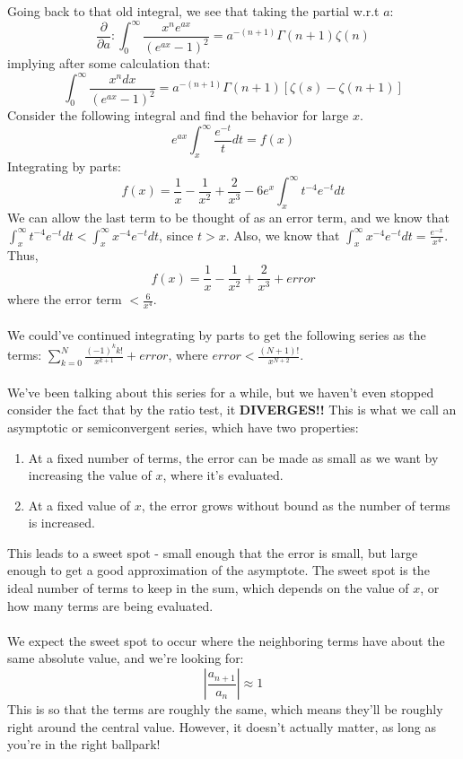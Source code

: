 \documentclass{article}
\begin{document}
\\ \\
Going back to that old integral, we see that taking the partial w.r.t $a$:
\[\frac{\partial}{\partial a}: \int_{0}^{\infty}\frac{x^ne^{ax}}{(e^{ax}-1)^2} = a^{-(n+1)}\Gamma(n+1)\zeta(n)\]
implying after some calculation that:
\[\int_{0}^{\infty}\frac{x^ndx}{(e^{ax}-1)^2} = a^{-(n+1)}\Gamma(n+1)[\zeta(s)-\zeta(n+1)]\]
\newpage
Consider the following integral and find the behavior for large $x$.
\[e^{ax}\int_{x}^{\infty}\frac{e^{-t}}{t}dt = f(x)\]
Integrating by parts:
\[f(x) = \frac 1 x - \frac 1 {x^2} + \frac 2 {x^3} - 6e^x\int_{x}^{\infty} t^{-4}e^{-t}dt\]
We can allow the last term to be thought of as an error term, and we know that $\int_{x}^{\infty} t^{-4}e^{-t}dt < \int_{x}^{\infty} x^{-4}e^{-t}dt$, since $t>x$. Also,
we know that $\int_{x}^{\infty} x^{-4}e^{-t}dt = \frac{e^{-x}}{x^4}$. Thus, 
\[f(x) = \frac 1 x - \frac 1 {x^2} + \frac 2 {x^3} + error\]
where the error term $ < \frac 6 {x^4}$. \\ \\ 
We could've continued integrating by parts to get the following series as the terms: $\displaystyle \sum_{k=0}^{N} \frac{(-1)^kk!}{x^{k+1}} + error$, where $error < \frac{(N+1)!}{x^{N+2}}$.
\\ \\ 
We've been talking about this series for a while, but we haven't even stopped consider the fact that by the ratio test, it \textbf{DIVERGES!!} This is what we call an asymptotic or semiconvergent series, which have two properties:
\begin{enumerate}
    \item At a fixed number of terms, the error can be made as small as we want by increasing the value of $x$, where it's evaluated.
    \item At a fixed value of $x$, the error grows without bound as the number of terms is increased.
\end{enumerate}
This leads to a sweet spot - small enough that the error is small, but large enough to get a good approximation of the asymptote. The sweet spot is the ideal number of terms to keep in the sum, which depends on the value of $x$, or how many terms are being evaluated.
\\ \\ 
We expect the sweet spot to occur where the neighboring terms have about the same absolute value, and we're looking for:
\[\left| \frac{a_{n+1}}{a_n}\right| \approx 1\]
This is so that the terms are roughly the same, which means they'll be roughly right around the central value. However, it doesn't actually matter, as long as you're in the right ballpark!
\end{document}
